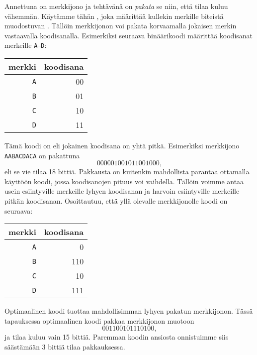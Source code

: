 
Annettuna on merkkijono ja tehtävänä on
\emph{pakata} se niin,
että tilaa kuluu vähemmän.
Käytämme tähän ,
joka määrittää kullekin merkille
biteistä muodostuvan .
Tällöin merkkijonon voi pakata
korvaamalla jokaisen merkin vastaavalla koodisanalla.
Esimerkiksi seuraava binäärikoodi määrittää
koodisanat merkeille \texttt{A}–\texttt{D}:
\begin{center}
\begin{tabular}{rr}
merkki & koodisana \\
\hline
\texttt{A} & 00 \\
\texttt{B} & 01 \\
\texttt{C} & 10 \\
\texttt{D} & 11 \\
\end{tabular}
\end{center}
Tämä koodi on 
eli jokainen koodisana on yhtä pitkä.
Esimerkiksi merkkijono
\texttt{AABACDACA} on pakattuna
\[000001001011001000,\]
eli se vie tilaa 18 bittiä.
Pakkausta on kuitenkin mahdollista parantaa
ottamalla käyttöön  koodi,
jossa koodisanojen pituus voi vaihdella.
Tällöin voimme antaa usein esiintyville merkeille
lyhyen koodisanan ja harvoin esiintyville
merkeille pitkän koodisanan.
Osoittautuu, että yllä olevalle merkkijonolle
 koodi on seuraava:
\begin{center}
\begin{tabular}{rr}
merkki & koodisana \\
\hline
\texttt{A} & 0 \\
\texttt{B} & 110 \\
\texttt{C} & 10 \\
\texttt{D} & 111 \\
\end{tabular}
\end{center}
Optimaalinen koodi tuottaa
mahdollisimman lyhyen pakatun merkkijonon.
Tässä tapauksessa optimaalinen koodi
pakkaa merkkijonon muotoon
\[001100101110100,\]
ja tilaa kuluu vain 15 bittiä.
Paremman koodin ansiosta onnistuimme siis säästämään
3 bittiä tilaa pakkauksessa.

